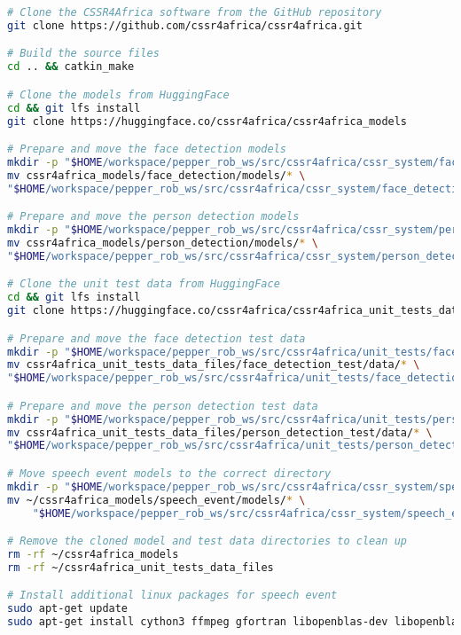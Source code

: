 \documentclass{CSSRforAfrica}
\begin{document}
{\begin{lstlisting}[style=withoutNumbering, language=bash]
# Clone the CSSR4Africa software from the GitHub repository
git clone https://github.com/cssr4africa/cssr4africa.git

# Build the source files
cd .. && catkin_make

# Clone the models from HuggingFace
cd && git lfs install
git clone https://huggingface.co/cssr4africa/cssr4africa_models

# Prepare and move the face detection models
mkdir -p "$HOME/workspace/pepper_rob_ws/src/cssr4africa/cssr_system/face_detection/models"
mv cssr4africa_models/face_detection/models/* \
"$HOME/workspace/pepper_rob_ws/src/cssr4africa/cssr_system/face_detection/models/"

# Prepare and move the person detection models
mkdir -p "$HOME/workspace/pepper_rob_ws/src/cssr4africa/cssr_system/person_detection/models"
mv cssr4africa_models/person_detection/models/* \
"$HOME/workspace/pepper_rob_ws/src/cssr4africa/cssr_system/person_detection/models/"

# Clone the unit test data from HuggingFace
cd && git lfs install
git clone https://huggingface.co/cssr4africa/cssr4africa_unit_tests_data_files

# Prepare and move the face detection test data
mkdir -p "$HOME/workspace/pepper_rob_ws/src/cssr4africa/unit_tests/face_detection_test/data"
mv cssr4africa_unit_tests_data_files/face_detection_test/data/* \
"$HOME/workspace/pepper_rob_ws/src/cssr4africa/unit_tests/face_detection_test/data/"

# Prepare and move the person detection test data
mkdir -p "$HOME/workspace/pepper_rob_ws/src/cssr4africa/unit_tests/person_detection_test/data"
mv cssr4africa_unit_tests_data_files/person_detection_test/data/* \
"$HOME/workspace/pepper_rob_ws/src/cssr4africa/unit_tests/person_detection_test/data/"

# Move speech event models to the correct directory
mkdir -p "$HOME/workspace/pepper_rob_ws/src/cssr4africa/cssr_system/speech_event/models"
mv ~/cssr4africa_models/speech_event/models/* \
    "$HOME/workspace/pepper_rob_ws/src/cssr4africa/cssr_system/speech_event/models"

# Remove the cloned model and test data directories to clean up
rm -rf ~/cssr4africa_models
rm -rf ~/cssr4africa_unit_tests_data_files

# Install additional linux packages for speech event
sudo apt-get update
sudo apt-get install cython3 ffmpeg gfortran libopenblas-dev libopenblas64-dev patchelf pkg-config portaudio19-dev python3-testresources python3-tk python3-typing-extensions sox


\end{lstlisting}}
\end{document}
